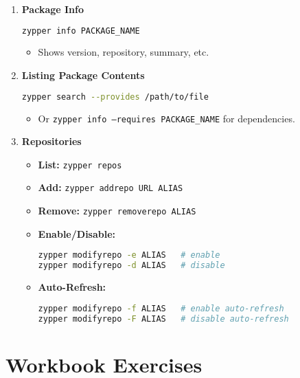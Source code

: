 \documentclass[12pt,a4paper]{report}
\begin{document}
\begin{enumerate}
    \item \textbf{Package Info}
    \begin{lstlisting}[language=bash]
zypper info PACKAGE_NAME
    \end{lstlisting}
    \begin{itemize}
        \item Shows version, repository, summary, etc.
    \end{itemize}

    \item \textbf{Listing Package Contents}
    \begin{lstlisting}[language=bash]
zypper search --provides /path/to/file
    \end{lstlisting}
    \begin{itemize}
        \item Or \texttt{zypper info --requires PACKAGE\_NAME} for dependencies.
    \end{itemize}

    \item \textbf{Repositories}
    \begin{itemize}
        \item \textbf{List:} \texttt{zypper repos}
        \item \textbf{Add:} \texttt{zypper addrepo URL ALIAS}
        \item \textbf{Remove:} \texttt{zypper removerepo ALIAS}
        \item \textbf{Enable/Disable:}
        \begin{lstlisting}[language=bash]
zypper modifyrepo -e ALIAS   # enable
zypper modifyrepo -d ALIAS   # disable
        \end{lstlisting}
        \item \textbf{Auto-Refresh:}
        \begin{lstlisting}[language=bash]
zypper modifyrepo -f ALIAS   # enable auto-refresh
zypper modifyrepo -F ALIAS   # disable auto-refresh
        \end{lstlisting}
    \end{itemize}
\end{enumerate}

\section*{Workbook Exercises}
\end{document}
